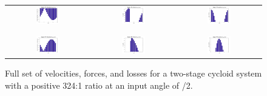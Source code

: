 \begin{figure}[h]
   \centering
   \begin{tabular}{ccc}
	   \includegraphics[width=0.30\textwidth]{fig/double_1_vel_pi_2} &
	   \includegraphics[width=0.30\textwidth]{fig/double_1_forces_pi_2} &
	   \includegraphics[width=0.30\textwidth]{fig/double_1_losses_pi_2} \\
	   \\
	   \hline
	   \\
	   \includegraphics[width=0.30\textwidth]{fig/double_2_vel_pi_2} &
	   \includegraphics[width=0.30\textwidth]{fig/double_2_forces_pi_2} &
	   \includegraphics[width=0.30\textwidth]{fig/double_2_losses_pi_2} \\
   \end{tabular}
   \caption{Full set of velocities, forces, and losses for a two-stage cycloid system with a positive 324:1 ratio at an input angle of \textpi/2.}
   \label{fig:two_stage_forces_pos}
\end{figure}
